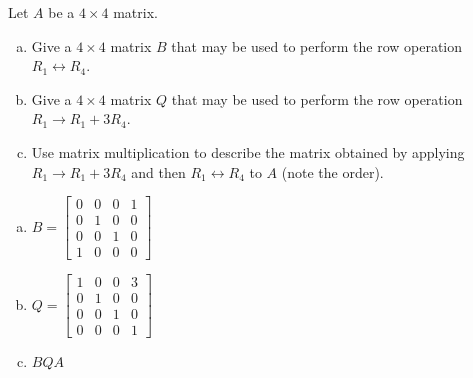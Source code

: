 
\begin{exerciseStatement}


Let \(A\) be a \(4 \times 4\) matrix.


\begin{enumerate}[(a)]
\item Give a \(4 \times 4\) matrix \(B\) that may be used to perform the row operation \( R_1 \leftrightarrow R_4 \).
\item Give a \(4 \times 4\) matrix \(Q\) that may be used to perform the row operation \( R_1 \to R_1 + 3R_4 \).
\item Use matrix multiplication to describe the matrix obtained by applying \( R_1 \to R_1 + 3R_4 \) and then \( R_1 \leftrightarrow R_4 \) to \(A\) (note the order). 
\end{enumerate}
    
\end{exerciseStatement}
    
\begin{exerciseAnswer} 

\begin{enumerate}[(a)]
\item \(B= \left[\begin{array}{cccc}
0 & 0 & 0 & 1 \\
0 & 1 & 0 & 0 \\
0 & 0 & 1 & 0 \\
1 & 0 & 0 & 0
\end{array}\right] \)
\item \(Q= \left[\begin{array}{cccc}
1 & 0 & 0 & 3 \\
0 & 1 & 0 & 0 \\
0 & 0 & 1 & 0 \\
0 & 0 & 0 & 1
\end{array}\right] \)
\item \(BQA\)
\end{enumerate}
    
\end{exerciseAnswer}
    

